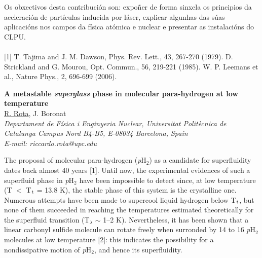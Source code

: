 Os obxectivos desta contribución son: expoñer de forma sinxela os principios
da aceleración de partículas inducida por láser, explicar algunhas das súas
aplicacións nos campos da física atómica e nuclear e presentar as instalacións do
CLPU.
\\
\vspace{0.5cm}
\\
{\footnotesize
[1] T. Tajima and J. M. Dawson, Phys. Rev. Lett., 43, 267-270 (1979).
\newline
[2] D. Strickland and G. Mourou, Opt. Commun., 56, 219-221 (1985).
\newline
[3] W. P. Leemans et al., Nature Phys., 2, 696-699 (2006).
}
\newpage
\setcounter{figure}{0}
\begin{center}
{\bf \Large
A metastable \textit{superglass} phase
in molecular para-hydrogen at low temperature
}
\\
\vspace{0.5cm}
\underline{R. Rota}, J. Boronat
\\
\vspace{0.5cm}
{\it
Departament de Física i Enginyeria Nuclear, Universitat Politècnica de Catalunya
Campus Nord B4-B5, E-08034 Barcelona, Spain
}
\\
\vspace{0.5cm}
{\it E-mail: riccardo.rota@upc.edu}
\\
\vspace{0.5cm}
\end{center}
The proposal of molecular para-hydrogen (\textit{p}H$_{2}$) as a candidate for superfluidity dates back almost
40 years [1]. Until now, the experimental evidences of such a superfluid phase in \textit{p}H$_{2}$ have been
impossible to detect since, at low temperature (T $<$ T$_{\rm t}$ = 13.8 K), the stable phase of this system
is the crystalline one. Numerous attempts have been made to supercool liquid hydrogen below T$_{\rm t}$,
but none of them succeeded in reaching the temperatures estimated theoretically for the superfluid
transition (T$_{\lambda}$ $\sim$ 1--2 K). Nevertheless, it has been shown that a linear carbonyl sulfide molecule
can rotate freely when surronded by 14 to 16 \textit{p}H$_{2}$ molecules at low temperature [2]: this indicates
the possibility for a nondissipative motion of \textit{p}H$_{2}$, and hence its superfluidity.

